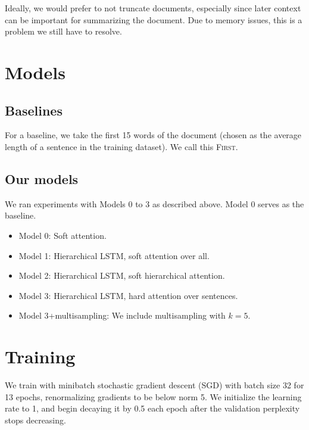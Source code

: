 \documentclass[11pt]{report}
\begin{document}
Ideally, we would prefer to not truncate documents, especially since later context can be important for summarizing the document. Due to memory issues, this is a problem we still have to resolve.

\section{Models}

\subsection{Baselines}

For a baseline, we take the first 15 words of the document (chosen as the average length of a sentence in the training dataset). We call this \textsc{First}. 



\subsection{Our models}

We ran experiments with Models 0 to 3 as described above. Model 0 serves as the baseline.

\begin{itemize}
\item Model 0: Soft attention.
\item Model 1: Hierarchical LSTM, soft attention over all.
\item Model 2: Hierarchical LSTM, soft hierarchical attention.
\item Model 3: Hierarchical LSTM, hard attention over sentences.
\item Model 3+multisampling: We include multisampling with $k=5$.
\end{itemize}



\section{Training}

We train with minibatch stochastic gradient descent (SGD) with batch size 32 for 13 epochs, renormalizing gradients to be below norm 5. We initialize the learning rate to 1, and begin decaying it by 0.5 each epoch after the validation perplexity stops decreasing. 
\end{document}

